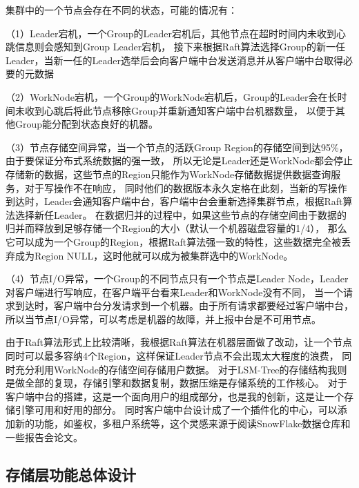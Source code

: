 		集群中的一个节点会存在不同的状态，可能的情况有：

		（1）Leader宕机，一个Group的Leader宕机后，其他节点在超时时间内未收到心跳信息则会感知到Group Leader宕机，
		接下来根据Raft算法选择Group的新一任Leader，当新一任的Leader选举后会向客户端中台发送消息并从客户端中台取得必要的元数据
		
		（2）WorkNode宕机，一个Group的WorkNode宕机后，Group的Leader会在长时间未收到心跳后将此节点移除Group并重新通知客户端中台机器数量，
		以便于其他Group能分配到状态良好的机器。
		
		（3）节点存储空间异常，当一个节点的活跃Group Region的存储空间到达95\%，由于要保证分布式系统数据的强一致，
		所以无论是Leader还是WorkNode都会停止存储新的数据，这些节点的Region只能作为WorkNode存储数据提供数据查询服务，对于写操作不在响应，
		同时他们的数据版本永久定格在此刻，当新的写操作到达时，Leader会通知客户端中台，客户端中台会重新选择集群节点，根据Raft算法选择新任Leader。
		在数据归并的过程中，如果这些节点的存储空间由于数据的归并而释放到足够存储一个Region的大小（默认一个机器磁盘容量的1/4），
		那么它可以成为一个Group的Region，根据Raft算法强一致的特性，这些数据完全被丢弃成为Region NULL，这时他就可以成为被集群选中的WorkNode。

		（4）节点I/O异常，一个Group的不同节点只有一个节点是Leader Node，Leader对客户端进行写响应，在客户端平台看来Leader和WorkNode没有不同，
		当一个请求到达时，客户端中台分发请求到一个机器。由于所有请求都要经过客户端中台，所以当节点I/O异常，可以考虑是机器的故障，并上报中台是不可用节点。

		由于Raft算法形式上比较清晰，我根据Raft算法在机器层面做了改动，让一个节点同时可以最多容纳4个Region，这样保证Leader节点不会出现太大程度的浪费，
		同时充分利用WorkNode的存储空间存储用户数据。
		对于LSM-Tree的存储结构我则是做全部的复现，存储引擎和数据复制，数据压缩是存储系统的工作核心。
		对于客户端中台的搭建，这是一个面向用户的组成部分，也是我的创新，这是让一个存储引擎可用和好用的部分。
		同时客户端中台设计成了一个插件化的中心，可以添加新的功能，如鉴权，多租户系统等，这个灵感来源于阅读SnowFlake数据仓库和一些报告会论文。


		  
	\subsection{存储层功能总体设计}
			
